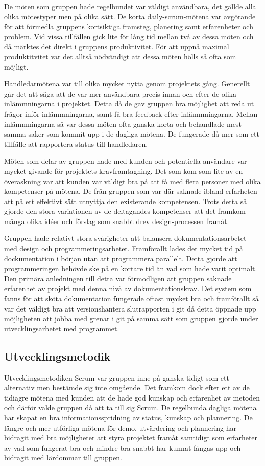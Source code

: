 De möten som gruppen hade regelbundet var väldigt användbara, det gällde alla olika mötestyper men på olika sätt. De korta daily-scrum-mötena var avgörande för att förmedla gruppens kortsiktiga framsteg, planering samt erfarenheter och problem. Vid vissa tillfällen gick lite för lång tid mellan två av dessa möten och då märktes det direkt i gruppens produktivitet. För att uppnå maximal produktitvitet var det alltså nödvändigt att dessa möten hölls så ofta som möjligt.

Handledarmötena var till olika mycket nytta genom projektets gång. Generellt går det att säga att de var mer användbara precis innan och efter de olika inlämmningarna i projektet. Detta då de gav gruppen bra möjlighet att reda ut frågor inför inlämmningarna, samt få bra feedback efter inlämmningarna. 
Mellan inlämmningarna så var dessa möten ofta ganska korta och behandlade mest samma saker som kommit upp i de dagliga mötena. De fungerade då mer som ett tillfälle att rapportera status till handledaren.

Möten som delar av gruppen hade med kunden och potentiella användare var mycket givande för projektets kravframtagning. Det som kom som lite av en överaskning var att kunden var väldigt bra på att få med flera personer med olika kompetenser på mötena. De från gruppen som var där saknade ibland erfarheten att på ett effektivt sätt utnyttja den existerande kompetensen. 
Trots detta så gjorde den stora variationen av de deltagandes kompetenser att det framkom många olika idéer och förslag som snabbt drev design-processen framåt. 

Gruppen hade relativt stora svårigheter att balansera dokumentationsarbetet med design och programmeringsarbetet. Framförallt lades det mycket tid på dockumentation i början utan att programmera parallelt. Detta gjorde att programmeringen behövde ske på en kortare tid än vad som hade varit optimalt. Den primära anledningen till detta var förmodligen att gruppen saknade erfarenhet av projekt med denna nivå av dokumentationskrav. Det system som fanns för att sköta dokumentation fungerade oftast mycket bra och framförallt så var det väldigt bra att versionshantera slutrapporten i git då detta öppnade upp möjligheten att jobba med grenar i git på samma sätt som gruppen gjorde under utvecklingsarbetet med programmet.

\subsection{Utvecklingsmetodik}
Utvecklingsmetodiken Scrum var gruppen inne på ganska tidigt som ett alternativ men bestämde sig inte omgående. Det framkom dock efter ett av de tidiagre mötena med kunden att de hade god kunskap och erfarenhet av metoden och därför valde gruppen då att ta till sig Scrum. De regelbunda dagliga mötena har skapat en bra informationsspridning av status, kunskap och plannering. De längre och mer utförliga mötena för demo, utvärdering och plannering har bidragit med bra möjligheter att styra projektet framåt samtidigt som erfarheter av vad som fungerat bra och mindre bra snabbt har kunnat fångas upp och bidragit med lärdommar till gruppen.

